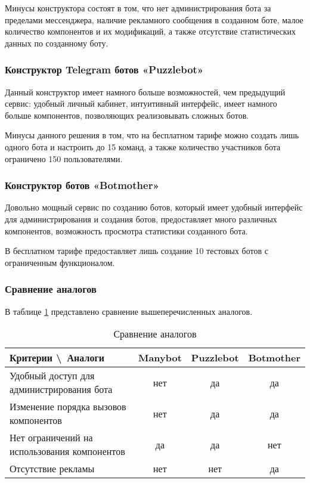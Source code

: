 Минусы конструктора состоят в том, что нет администрирования
бота за пределами мессенджера, наличие рекламного сообщения в
созданном боте, малое количество компонентов и их модификаций,
а также отсутствие статистических данных по созданному боту.

\subsubsection{Конструктор Telegram ботов «Puzzlebot»}


Данный конструктор имеет намного больше возможностей, чем предыдущий сервис:
удобный личный кабинет, интуитивный интерфейс, имеет намного больше компонентов,
позволяющих реализовывать сложных ботов.

Минусы данного решения в том, что на бесплатном тарифе
можно создать лишь одного бота и настроить до 15 команд, а также
количество участников бота ограничено 150 пользователями.

\subsubsection{Конструктор ботов «Botmother»}

Довольно мощный сервис по созданию ботов, который имеет удобный интерфейс
для администрирования и создания ботов, предоставляет много различных компонентов,
возможность просмотра статистики созданного бота.

В бесплатном тарифе предоставляет лишь создание 10 тестовых ботов с ограниченным
функционалом.

\subsubsection{Сравнение аналогов}

В таблице \ref{t:comp-an} представлено сравнение вышеперечисленных аналогов.

\begin{table}[h]
	\Large
	\caption{Сравнение аналогов}
	\label{t:comp-an}
	\centering
	\begin{tabularx}{\textwidth}{|X|c|c|c|}
		\hline
		Критерии \textbackslash\ Аналоги & Manybot & Puzzlebot & Botmother \\
		\hline
		Удобный доступ для администрирования бота
		                                 & нет     & да        & да        \\
		\hline
		Изменение порядка вызовов компонентов
		                                 & нет     & да        & да        \\
		\hline
		Нет ограничений на использования компонентов
		                                 & да      & да        & нет       \\
		\hline
		Отсутствие рекламы
		                                 & нет     & нет       & да        \\
		\hline
	\end{tabularx}
\end{table}


